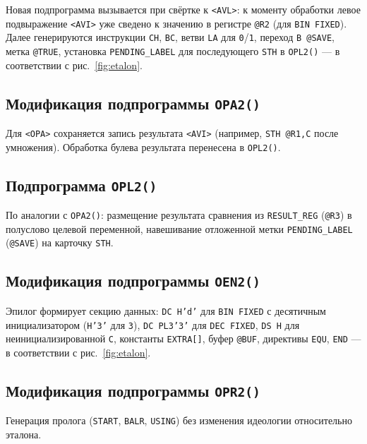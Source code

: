 \documentclass[a4paper,14pt]{extarticle}
\begin{document}
Новая подпрограмма вызывается при свёртке к \texttt{<AVL>}: к моменту обработки левое подвыражение \texttt{<AVI>} уже сведено к значению
в регистре \texttt{@R2} (для \texttt{BIN FIXED}). Далее генерируются инструкции \texttt{CH}, \texttt{BC}, ветви \texttt{LA} для \texttt{0}/\texttt{1},
переход \texttt{B @SAVE}, метка \texttt{@TRUE}, установка \texttt{PENDING\_LABEL} для последующего \texttt{STH} в \texttt{OPL2()} —
в соответствии с рис.~\ref{fig:etalon}.

\subsection{Модификация подпрограммы \texttt{OPA2()}}

Для \texttt{<OPA>} сохраняется запись результата \texttt{<AVI>} (например, \texttt{STH @R1,C} после умножения). Обработка булева результата
перенесена в \texttt{OPL2()}.

\subsection{Подпрограмма \texttt{OPL2()}}

По аналогии с \texttt{OPA2()}: размещение результата сравнения из \texttt{RESULT\_REG} (\texttt{@R3}) в полуслово целевой переменной,
навешивание отложенной метки \texttt{PENDING\_LABEL} (\texttt{@SAVE}) на карточку \texttt{STH}.

\subsection{Модификация подпрограммы \texttt{OEN2()}}

Эпилог формирует секцию данных: \texttt{DC H'd'} для \texttt{BIN FIXED} с десятичным инициализатором (\texttt{H'3'} для \texttt{3}),
\texttt{DC PL3'3'} для \texttt{DEC FIXED}, \texttt{DS H} для неинициализированной \texttt{C}, константы \texttt{EXTRA[]}, буфер \texttt{@BUF},
директивы \texttt{EQU}, \texttt{END} — в соответствии с рис.~\ref{fig:etalon}.

\subsection{Модификация подпрограммы \texttt{OPR2()}}

Генерация пролога (\texttt{START}, \texttt{BALR}, \texttt{USING}) без изменения идеологии относительно эталона.

\end{document}
